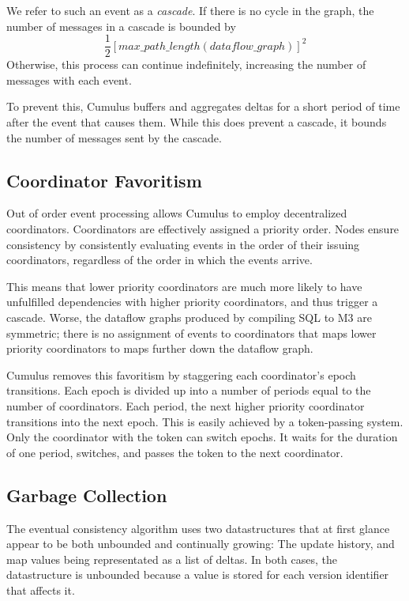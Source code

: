 \documentclass{vldb}
\begin{document}
We refer to such an event as a \textit{cascade}.  If there is no cycle in the graph, the number of messages in a cascade is bounded by 
$$\frac 12 [max\_path\_length(dataflow\_graph)]^2$$
Otherwise, this process can continue indefinitely, increasing the number of messages with each event.  

To prevent this, Cumulus buffers and aggregates deltas for a short period of time after the event that causes them.  While this does prevent a cascade, it bounds the number of messages sent by the cascade.


\subsection{Coordinator Favoritism}

Out of order event processing allows Cumulus to employ decentralized coordinators.  Coordinators are effectively assigned a priority order.  Nodes ensure consistency by consistently evaluating events in the order of their issuing coordinators, regardless of the order in which the events arrive.

This means that lower priority coordinators are much more likely to have unfulfilled dependencies with higher priority coordinators, and thus trigger a cascade.  Worse, the dataflow graphs produced by compiling SQL to M3 are symmetric; there is no assignment of events to coordinators that maps lower priority coordinators to maps further down the dataflow graph.

Cumulus removes this favoritism by staggering each coordinator's epoch transitions.  Each epoch is divided up into a number of periods equal to the number of coordinators.  Each period, the next higher priority coordinator transitions into the next epoch.  This is easily achieved by a token-passing system.  Only the coordinator with the token can switch epochs.  It waits for the duration of one period, switches, and passes the token to the next coordinator.

\subsection{Garbage Collection}
The eventual consistency algorithm uses two datastructures that at first glance appear to be both unbounded and continually growing: The update history, and map values being representated as a list of deltas.  In both cases, the datastructure is unbounded because a value is stored for each version identifier that affects it. 
\end{document}
